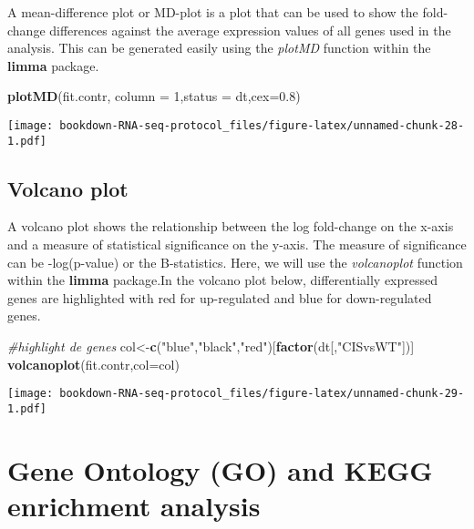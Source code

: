 \documentclass[]{book}
\newenvironment{Shaded}{\begin{snugshade}}{\end{snugshade}}
\newcommand{\CommentTok}[1]{\textcolor[rgb]{0.56,0.35,0.01}{\textit{#1}}}
\newcommand{\DataTypeTok}[1]{\textcolor[rgb]{0.13,0.29,0.53}{#1}}
\newcommand{\DecValTok}[1]{\textcolor[rgb]{0.00,0.00,0.81}{#1}}
\newcommand{\FloatTok}[1]{\textcolor[rgb]{0.00,0.00,0.81}{#1}}
\newcommand{\KeywordTok}[1]{\textcolor[rgb]{0.13,0.29,0.53}{\textbf{#1}}}
\newcommand{\NormalTok}[1]{#1}
\newcommand{\StringTok}[1]{\textcolor[rgb]{0.31,0.60,0.02}{#1}}
\begin{document}
A mean-difference plot or MD-plot is a plot that can be used to show the fold-change differences against the average expression values of all genes used in the analysis. This can be generated easily using the \emph{plotMD} function within the \textbf{limma} package.

\begin{Shaded}
\begin{Highlighting}[]
\KeywordTok{plotMD}\NormalTok{(fit.contr, }\DataTypeTok{column =} \DecValTok{1}\NormalTok{,}\DataTypeTok{status =}\NormalTok{ dt,}\DataTypeTok{cex=}\FloatTok{0.8}\NormalTok{)}
\end{Highlighting}
\end{Shaded}

\texttt{[image: bookdown-RNA-seq-protocol\_files/figure-latex/unnamed-chunk-28-1.pdf]}

\hypertarget{volcano-plot}{%
\subsection{Volcano plot}\label{volcano-plot}}

A volcano plot shows the relationship between the log fold-change on the x-axis and a measure of statistical significance on the y-axis. The measure of significance can be -log(p-value) or the B-statistics. Here, we will use the \emph{volcanoplot} function within the \textbf{limma} package.In the volcano plot below, differentially expressed genes are highlighted with red for up-regulated and blue for down-regulated genes.

\begin{Shaded}
\begin{Highlighting}[]
\CommentTok{#highlight de genes}
\NormalTok{col<-}\KeywordTok{c}\NormalTok{(}\StringTok{"blue"}\NormalTok{,}\StringTok{"black"}\NormalTok{,}\StringTok{"red"}\NormalTok{)[}\KeywordTok{factor}\NormalTok{(dt[,}\StringTok{"CISvsWT"}\NormalTok{])]}
\KeywordTok{volcanoplot}\NormalTok{(fit.contr,}\DataTypeTok{col=}\NormalTok{col)}
\end{Highlighting}
\end{Shaded}

\texttt{[image: bookdown-RNA-seq-protocol\_files/figure-latex/unnamed-chunk-29-1.pdf]}

\hypertarget{gene-ontology-go-and-kegg-enrichment-analysis}{%
\section{Gene Ontology (GO) and KEGG enrichment analysis}\label{gene-ontology-go-and-kegg-enrichment-analysis}}
\end{document}

